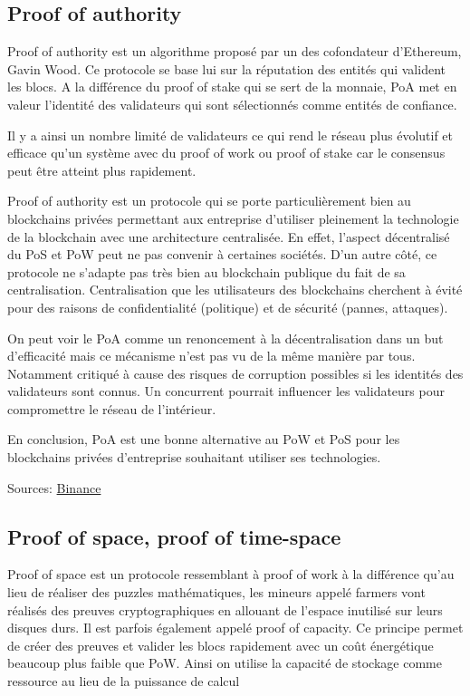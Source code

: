 \subsection{Proof of authority}

Proof of authority est un algorithme proposé par un des cofondateur d'Ethereum, Gavin Wood. Ce protocole se base lui sur la réputation des entités qui valident les blocs. A la différence du proof of stake qui se sert de la monnaie, PoA met en valeur l'identité des validateurs qui sont sélectionnés comme entités de confiance.

Il y a ainsi un nombre limité de validateurs ce qui rend le réseau plus évolutif et efficace qu'un système avec du proof of work ou proof of stake car le consensus peut être atteint plus rapidement.

Proof of authority est un protocole qui se porte particulièrement bien au blockchains privées permettant aux entreprise d'utiliser pleinement la technologie de la blockchain avec une architecture centralisée. En effet, l'aspect décentralisé du PoS et PoW peut ne pas convenir à certaines sociétés. D'un autre côté, ce protocole ne s'adapte pas très bien au blockchain publique du fait de sa centralisation. Centralisation que les utilisateurs des blockchains cherchent à évité pour des raisons de confidentialité (politique) et de sécurité (pannes, attaques).

On peut voir le PoA comme un renoncement à la décentralisation dans un but d'efficacité mais ce mécanisme n'est pas vu de la même manière par tous. Notamment critiqué à cause des risques de corruption possibles si les identités des validateurs sont connus. Un concurrent pourrait influencer les validateurs pour compromettre le réseau de l'intérieur.

En conclusion, PoA est une bonne alternative au PoW et PoS pour les blockchains privées d'entreprise souhaitant utiliser ses technologies.

Sources: \href{https://academy.binance.com/fr/articles/proof-of-authority-explained}{Binance}

\subsection{Proof of space, proof of time-space}

Proof of space est un protocole ressemblant à proof of work à la différence qu'au lieu de réaliser des puzzles mathématiques, les mineurs appelé farmers vont réalisés des preuves cryptographiques en allouant de l'espace inutilisé sur leurs disques durs. Il est parfois également appelé proof of capacity. Ce principe permet de créer des preuves et valider les blocs rapidement avec un coût énergétique beaucoup plus faible que PoW. Ainsi on utilise la capacité de stockage comme ressource au lieu de la puissance de calcul

